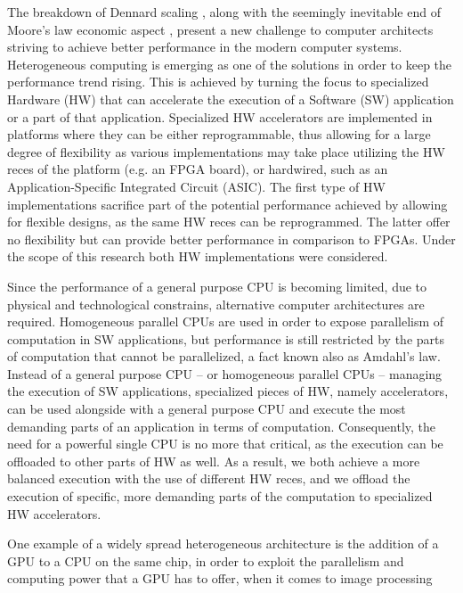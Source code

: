 \documentclass[]{usiinfthesis}
\begin{document}
The breakdown of Dennard scaling \cite{esmaeilzadeh2011dark}, along with the seemingly inevitable 
end of Moore's law economic aspect \cite{simonite2016moore}, present a new challenge to computer 
architects striving to achieve
better performance in the modern computer systems.
Heterogeneous computing is emerging as one of the solutions in order to keep the performance 
trend rising. This is achieved by turning the focus to specialized Hardware (HW) that 
can accelerate the execution of a Software (SW) application or a part of that application. Specialized HW 
accelerators are implemented in platforms where they can be either reprogrammable, 
thus allowing for a large degree of flexibility as various implementations may take place utilizing
the HW reces of the platform (e.g. an FPGA board), or hardwired, such as an Application-Specific Integrated 
Circuit (ASIC). The first type of HW implementations sacrifice part of the potential 
performance achieved by allowing for flexible designs, as the same HW reces can be reprogrammed.
The latter offer no flexibility but can provide better performance in comparison to FPGAs. Under 
the scope of this research both HW implementations were considered.  \par
%
%
Since the performance of a general purpose CPU is becoming limited, due to physical and technological 
constrains, alternative computer architectures are required. Homogeneous parallel CPUs are used in 
order to expose parallelism of computation in SW applications, but performance is still restricted 
by the parts of computation that cannot be parallelized, a fact known also as Amdahl's law.
Instead of a 
general purpose CPU -- or homogeneous parallel CPUs -- managing the execution of SW applications, 
specialized pieces
of HW, namely accelerators, can be used alongside with a general purpose CPU and execute the
most demanding parts of an application in terms of computation. Consequently, the need for 
a powerful single CPU is no more that critical, as the execution can be offloaded to other
parts of HW as well. %
As a result, we both achieve a more balanced execution with 
the use of different HW reces, and we offload the execution of specific, more demanding 
parts of the computation to specialized HW accelerators.\par
One example of a widely spread 
heterogeneous architecture is the addition of a GPU to a CPU on the same chip, in order 
to exploit the
parallelism and computing power that a GPU has to offer, when it comes to image processing 
\end{document}
